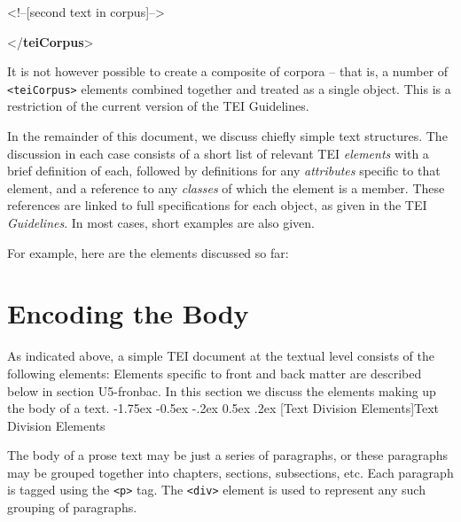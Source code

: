 \documentclass[11pt,twoside]{article}\makeatletter
\makeatletter
\renewcommand\section{\@startsection {section}{1}{\z@}%
     {-1.75ex \@plus -0.5ex \@minus -.2ex}%
     {0.5ex \@plus .2ex}%
     {\reset@font\Large\bfseries\sffamily}}
\renewcommand\subsection{\@startsection{subsection}{2}{\z@}%
     {-1.75ex\@plus -0.5ex \@minus- .2ex}%
     {0.5ex \@plus .2ex}%
     {\reset@font\Large\sffamily}}
\def\DivI{\section}
\def\DivII{\subsection}
\def\DivI{\chapter}
\def\DivII{\section}
\makeatother
\begin{document}
\begin{shaded}
\hspace*{6pt}\mbox{}\newline 
\hspace*{6pt}\mbox{}\newline 
\begin{it}<!--[second text in corpus]-->\end{it}\mbox{}\newline 
\hspace*{6pt}\mbox{}\newline 
{}\mbox{}\newline 
{</\textbf{teiCorpus}>}\end{shaded}\egroup\par \noindent  It is not however possible to create a composite of corpora -- that is, a number of \texttt{<teiCorpus>} elements combined together and treated as a single object. This is a restriction of the current version of the TEI Guidelines.\par
In the remainder of this document, we discuss chiefly simple text structures. The discussion in each case consists of a short list of relevant TEI \emph{elements} with a brief definition of each, followed by definitions for any \emph{attributes} specific to that element, and a reference to any \emph{classes} of which the element is a member. These references are linked to full specifications for each object, as given in the TEI \textit{Guidelines}. In most cases, short examples are also given.\par
For example, here are the elements discussed so far: 
\DivI[Encoding the Body]{Encoding the Body}\label{U5-body}\par
As indicated above, a simple TEI document at the textual level consists of the following elements:     Elements specific to front and back matter are described below in section U5-fronbac. In this section we discuss the elements making up the body of a text. 
\DivII[Text Division Elements]{Text Division Elements}\label{divs}\par
The body of a prose text may be just a series of paragraphs, or these paragraphs may be grouped together into chapters, sections, subsections, etc. Each paragraph is tagged using the \texttt{<p>} tag. The \texttt{<div>} element is used to represent any such grouping of paragraphs.     \par
\end{document}
